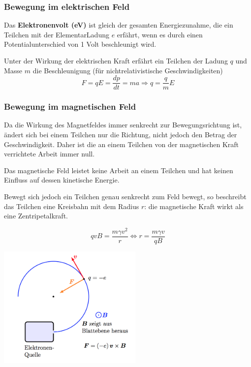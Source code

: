\documentclass[11pt]{article}
\begin{document}
\subsubsection{Bewegung im elektrischen Feld}

Das \textbf{Elektronenvolt (eV)} ist gleich der gesamten Energiezunahme, die ein Teilchen mit der ElementarLadung $e$ erfährt, wenn es durch einen Potentialunterschied von 1 Volt beschleunigt wird. \newline

Unter der Wirkung der elektrischen Kraft erfährt ein Teilchen der Ladung $q$ und Masse $m$ die Beschleunigung (für nichtrelativistische Geschwindigkeiten)
\begin{equation*}
	F = qE = \frac{dp}{dt} = ma \Rightarrow q = \frac{q}{m}E
\end{equation*}

\subsubsection{Bewegung im magnetischen Feld}

Da die Wirkung des Magnetfeldes immer senkrecht zur Bewegungsrichtung ist, ändert sich bei einem Teilchen nur die Richtung, nicht jedoch den Betrag der Geschwindigkeit. Daher ist die an einem Teilchen von der magnetischen Kraft verrichtete Arbeit immer null. \newline

Das magnetische Feld leistet keine Arbeit an einem Teilchen und hat keinen Einfluss auf dessen kinetische Energie. \newline

Bewegt sich jedoch ein Teilchen genau senkrecht zum Feld bewegt, so beschreibt das Teilchen eine Kreisbahn mit dem Radius $r$: die magnetische Kraft wirkt als eine Zentripetalkraft.

\begin{minipage}{.5\textwidth}
    \begin{equation*}
    qvB = \frac{m\gamma v^2}{r} \Leftrightarrow r = \frac{m\gamma v}{qB}
    \end{equation*}
\end{minipage}%
\begin{minipage}{.5\textwidth}
  	\centering
    \includegraphics[width=200pt]{images/mf/zentripetalkraft}
\end{minipage}
\end{document}
